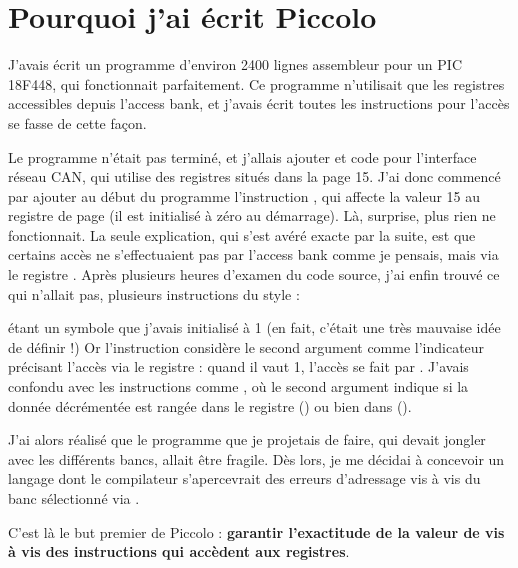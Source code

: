 

\chapter{Pourquoi j’ai écrit Piccolo}

\thispagestyle{empty}

J’avais écrit un programme d’environ 2400 lignes assembleur pour un PIC 18F448, qui fonctionnait parfaitement. Ce programme n’utilisait que les registres accessibles depuis l’access bank, et j’avais écrit toutes les instructions pour l’accès se fasse de cette façon.

Le programme n’était pas terminé, et j’allais ajouter et code pour l’interface réseau CAN, qui utilise des registres situés dans la page 15. J’ai donc commencé par ajouter au début du programme l’instruction , qui affecte la valeur 15 au registre de page  (il est initialisé à zéro au démarrage). Là, surprise, plus rien ne fonctionnait. La seule explication, qui s’est avéré exacte par la suite, est que certains accès ne s’effectuaient pas par l’access bank comme je pensais, mais via le registre . Après plusieurs heures d’examen du code source, j’ai enfin trouvé ce qui n’allait pas, plusieurs instructions du style :


 étant un symbole que j’avais initialisé à 1 (en fait, c’était une très mauvaise idée de définir  !) Or l’instruction  considère le second argument comme l’indicateur précisant l’accès via le registre  : quand il vaut 1, l’accès se fait par . J’avais confondu avec les instructions comme , où le second argument indique si la donnée décrémentée est rangée dans le registre () ou bien dans  ().

J’ai alors réalisé que le programme que je projetais de faire, qui devait jongler avec les différents bancs, allait être fragile. Dès lors, je me décidai à concevoir un langage dont le compilateur s’apercevrait des erreurs d’adressage vis à vis du banc sélectionné via .

C’est là le but premier de Piccolo : {\bf garantir l’exactitude de la valeur de  vis à vis des instructions qui accèdent aux registres}.


